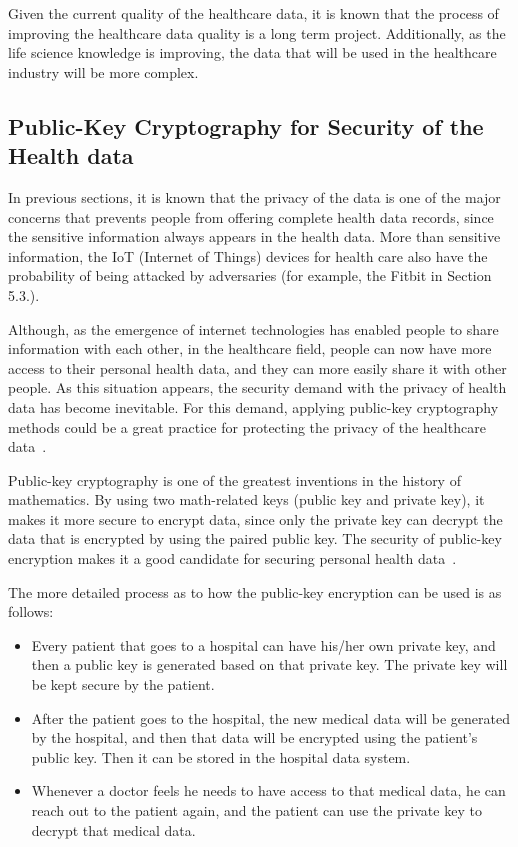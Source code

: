 Given the current quality of the healthcare data, it is known that the process 
of improving the healthcare data quality is a long term project. Additionally, 
as the life science knowledge is improving, the data that will be used in the 
healthcare industry will be more complex.

\subsection{Public-Key Cryptography for Security of the Health data}
In previous sections, it is known that the privacy of the data is one of 
the major concerns that prevents people from offering complete 
health data records, 
since the sensitive information always appears in the health data. 
More than sensitive information, 
the IoT (Internet of Things) devices for health 
care also have the probability of being attacked by 
adversaries (for example, 
the Fitbit in Section 5.3.).

Although, as the emergence of internet technologies 
has enabled people to 
share information with each other, in the healthcare field, 
people can now have 
more access to their personal health data, and they can 
more easily share 
it with other people. As this situation appears, 
the security demand with 
the privacy of health data has become inevitable. 
For this demand, applying 
public-key cryptography methods could be a 
great practice for protecting the 
privacy of the healthcare data~\cite{pke}.

Public-key cryptography is one of the greatest inventions in the history 
of mathematics. By using two math-related keys (public key and private key), 
it makes it more secure to encrypt data, since only the private key can 
decrypt the data that is encrypted by using the paired public key. The 
security of public-key encryption makes it a good candidate for 
securing personal health data~\cite{pke}.

The more detailed process as to how the public-key encryption can be 
used is as follows: 
\begin{itemize}
	\item Every patient that goes to a hospital can have his/her own private 
	key, and then a public key is generated based on that private key. The 
	private key will be kept secure by the patient. 
	\item After the patient goes to the hospital, the new medical data will be 
	generated by the hospital, and then that data will be encrypted using the 
	patient’s public key. Then it can be stored in the hospital data system. 
	\item Whenever a doctor feels he needs to have access to that
	medical data, he can reach out to the patient again, and the patient can 
	use the private key to decrypt that medical data. 
\end{itemize}

